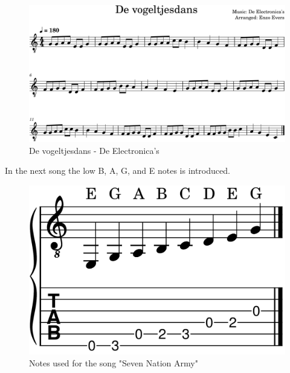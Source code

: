 \begin{figure}[h]
	\centering
	\includegraphics[width=\textwidth]{../../MuseScore/Guitar/GuitarVogeltjesdansDeElectronicas.png}
	\caption{De vogeltjesdans - De Electronica's}
	\label{fig:guitar_vogeltjesdans}
\end{figure}


\newpage

In the next song the low B, A, G, and E notes is introduced.

\begin{figure}[h]
	\centering
	\includegraphics[height=0.12\textheight]{../../MuseScore/Guitar/GuitarNotesUsedInSevenNationArmy.png}
	\caption{Notes used for the song "Seven Nation Army"}
	\label{fig:guitar_notes_for_seven_nation_army}
\end{figure}

